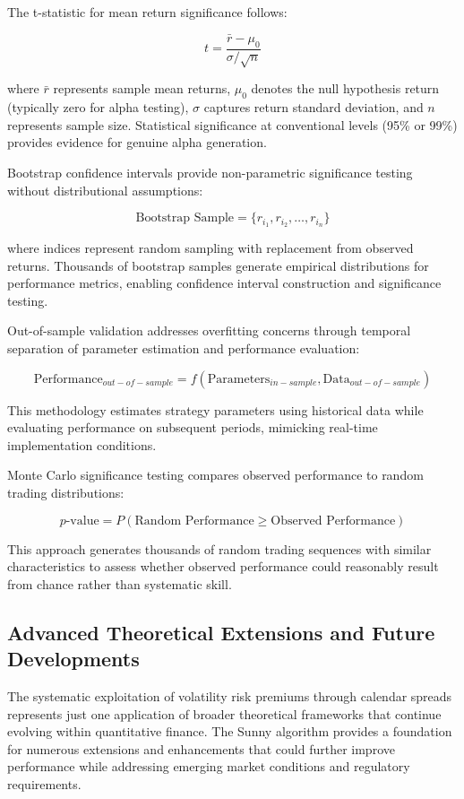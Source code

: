 \documentclass[
  american,
  11pt,
  11pt,
  letterpaper,
  onecolumn]{article}
\begin{document}
The t-statistic for mean return significance follows:

\[t = \frac{\bar{r} - \mu_0}{\sigma / \sqrt{n}}\]

where \(\bar{r}\) represents sample mean returns, \(\mu_0\) denotes the
null hypothesis return (typically zero for alpha testing), \(\sigma\)
captures return standard deviation, and \(n\) represents sample size.
Statistical significance at conventional levels (95\% or 99\%) provides
evidence for genuine alpha generation.

Bootstrap confidence intervals provide non-parametric significance
testing without distributional assumptions:

\[\text{Bootstrap Sample} = \{r_{i_1}, r_{i_2}, \ldots, r_{i_n}\}\]

where indices represent random sampling with replacement from observed
returns. Thousands of bootstrap samples generate empirical distributions
for performance metrics, enabling confidence interval construction and
significance testing.

Out-of-sample validation addresses overfitting concerns through temporal
separation of parameter estimation and performance evaluation:

\[\text{Performance}_{out-of-sample} = f(\text{Parameters}_{in-sample}, \text{Data}_{out-of-sample})\]

This methodology estimates strategy parameters using historical data
while evaluating performance on subsequent periods, mimicking real-time
implementation conditions.

Monte Carlo significance testing compares observed performance to random
trading distributions:

\[p\text{-value} = P(\text{Random Performance} \geq \text{Observed Performance})\]

This approach generates thousands of random trading sequences with
similar characteristics to assess whether observed performance could
reasonably result from chance rather than systematic skill.

\subsection{Advanced Theoretical Extensions and Future
Developments}\label{advanced-theoretical-extensions-and-future-developments}

The systematic exploitation of volatility risk premiums through calendar
spreads represents just one application of broader theoretical
frameworks that continue evolving within quantitative finance. The Sunny
algorithm provides a foundation for numerous extensions and enhancements
that could further improve performance while addressing emerging market
conditions and regulatory requirements.
\end{document}
